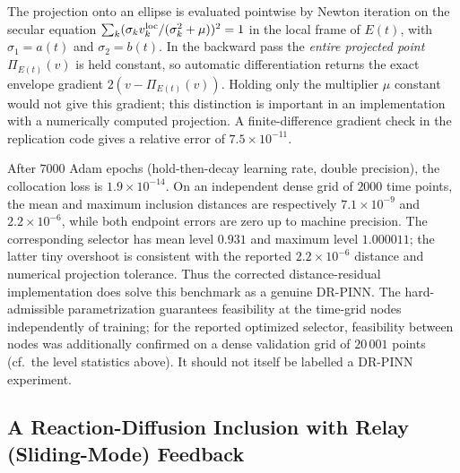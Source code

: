 \documentclass[11pt]{elsarticle}
\theoremstyle{definition}
\theoremstyle{remark}
\numberwithin{equation}{section}
\begin{document}
The projection onto an ellipse is evaluated pointwise by Newton iteration on
the secular equation
$\sum_k(\sigma_k v_k^{\rm loc}/(\sigma_k^2+\mu))^2=1$ in the local frame of
$E(t)$, with $\sigma_1=a(t)$ and $\sigma_2=b(t)$. In the backward pass the
\emph{entire projected point} $\Pi_{E(t)}(v)$ is held constant, so automatic
differentiation returns the exact envelope gradient
$2(v-\Pi_{E(t)}(v))$. Holding only the multiplier $\mu$ constant would not
give this gradient; this distinction is important in an implementation with
a numerically computed projection. A finite-difference gradient check in the
replication code gives a relative error of $7.5\times10^{-11}$.

After $7000$ Adam epochs (hold-then-decay learning rate, double precision),
the collocation loss is $1.9\times10^{-14}$. On an independent dense grid of
$2000$ time points, the mean and maximum inclusion distances are respectively
$7.1\times10^{-9}$ and $2.2\times10^{-6}$, while both endpoint errors are zero
up to machine precision. The corresponding selector has mean level $0.931$
and maximum level $1.000011$; the latter tiny overshoot is consistent with the
reported $2.2\times10^{-6}$ distance and numerical projection tolerance. Thus
the corrected distance-residual implementation does solve this benchmark as
a genuine DR-PINN. The hard-admissible parametrization guarantees
feasibility at the time-grid nodes independently of training; for the
reported optimized selector, feasibility between nodes was additionally
confirmed on a dense validation grid of $20\,001$ points (cf.\ the level
statistics above). It should not itself be labelled a DR-PINN experiment.

\subsection{A Reaction-Diffusion Inclusion with Relay (Sliding-Mode) Feedback}
\label{subsec:parabolic-PDI}
\end{document}
